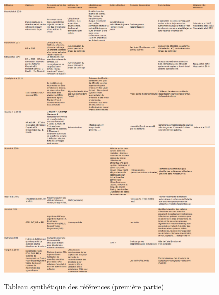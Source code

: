 \documentclass{article}
\begin{document}
		\begin{figure}
			\includegraphics[scale=0.47]{include/tri1.PNG}
			\includegraphics[scale=0.47]{include/tri2.PNG}
			\includegraphics[scale=0.47]{include/tri3.PNG}
			\includegraphics[scale=0.47]{include/tri4.PNG}
			\caption{Tableau synthétique des références (première partie)}
			\label{fig:tabsynt1}
		\end{figure}
\end{document}
